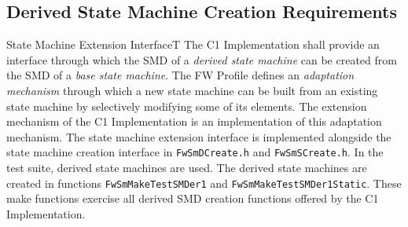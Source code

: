 \documentclass[requirements]{../fwprofile}
\begin{document}
\newpage
\subsection{Derived State Machine Creation Requirements}\label{req:creationInterfaceDerivedSM}

\begin{fw_req}{State Machine Extension Interface}{T}
{The C1 Implementation shall provide an interface through which 
the SMD of a \emph{derived state machine} can be created from the SMD of a 
\emph{base state machine}.}
{The FW Profile defines an \emph{adaptation mechanism} through 
which a new state machine can be built from an existing state machine by selectively 
modifying some of its elements. 
The extension mechanism of the C1 Implementation is an implementation of this adaptation 
mechanism.}
{The state machine extension interface is implemented alongside 
the state machine creation interface in \texttt{FwSmDCreate.h} and \texttt{FwSmSCreate.h}.} 
{In the test suite, derived state machines are used. 
The derived state machines are created in functions \texttt{FwSmMakeTestSMDer1} and 
\texttt{FwSmMakeTestSMDer1Static}. 
These make functions exercise all derived SMD creation functions offered 
by the C1 Implementation.}
\end{fw_req}
\end{document}
